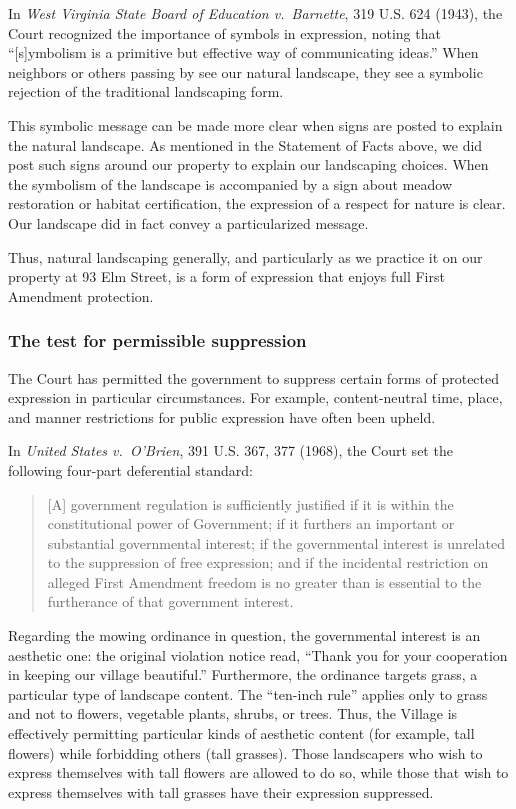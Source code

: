 \documentclass[12pt]{article}
\begin{document}
In {\it West Virginia State Board of Education v.\ Barnette}, 319 U.S. 624 (1943), the Court recognized the importance of symbols in expression, noting that 
``[s]ymbolism is a primitive but effective way of communicating ideas.''
When neighbors or others passing by see our natural landscape, they see a symbolic rejection of the traditional landscaping form.

This symbolic message can be made more clear when signs are posted to explain the natural landscape.
As mentioned in the Statement of Facts above, we did post such signs around our property to explain our landscaping choices.
When the symbolism of the landscape is accompanied by a sign about meadow restoration or habitat certification, the expression of a respect for nature is clear.
Our landscape did in fact convey a particularized message.

Thus, natural landscaping generally, and particularly as we practice it on our property at 93 Elm Street, is a form of expression that enjoys full First Amendment protection.

\subsubsection{The test for permissible suppression}

The Court has permitted the government to suppress certain forms of protected expression in particular circumstances.
For example, content-neutral time, place, and manner restrictions for public expression have often been upheld.  

In {\it United States v.\ O'Brien}, 391 U.S. 367, 377 (1968), the Court set the following four-part deferential standard:
\begin{quote}
[A] government regulation is sufficiently justified if it is within the constitutional power of Government; if it furthers an important or substantial governmental interest; if the governmental interest is unrelated to the suppression of free expression; and if the incidental restriction on alleged First Amendment freedom is no greater than is essential to the furtherance of that government interest.
\end{quote}

Regarding the mowing ordinance in question, the governmental interest is an aesthetic one:  the original violation notice read, ``Thank you for your cooperation in keeping our village beautiful.''
Furthermore, the ordinance targets grass, a particular type of landscape content.
The ``ten-inch rule'' applies only to grass and not to flowers, vegetable plants, shrubs, or trees.
Thus, the Village is effectively permitting particular kinds of aesthetic content (for example, tall flowers) while forbidding others (tall grasses).
Those landscapers who wish to express themselves with tall flowers are allowed to do so, while those that wish to express themselves with tall grasses have their expression suppressed.
\end{document}
